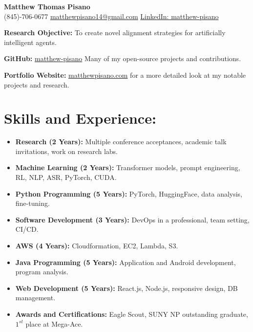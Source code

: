 \documentclass[12pt]{article}
\title{}
\author{\textbf{\LARGE Matthew Thomas Pisano}}
\date{}
\begin{document}
\pagestyle{plain}

\begin{tcolorbox}[width=\linewidth, sharp corners=all, colback=white!90!green, colframe=black]
    
    \begin{center}
        \textbf{\LARGE Matthew Thomas Pisano}\\
        \vspace{0.1in}
        (845)-706-0677 \hspace*{0.3in}
        \href{mailto:matthewpisano14@gmail.com}{matthewpisano14@gmail.com} \hspace*{0.5in}
        \href{https://www.linkedin.com/in/matthew-pisano/}{LinkedIn: matthew-pisano}
    \end{center}
    
\end{tcolorbox}

\vspace{0.1in}

\hspace*{-0.3in}
\textbf{Research Objective:} To create novel alignment strategies for artificially intelligent agents.

\vspace{0.1in}

\hspace*{-0.3in}
\textbf{GitHub:} \href{https://github.com/matthew-pisano}{matthew-pisano} Many of my open-source projects and contributions.

\hspace*{-0.3in}
\textbf{Portfolio Website:} \href{https://matthewpisano.com}{matthewpisano.com} for a more detailed look at my notable projects and research.

\section*{Skills and Experience:}
\begin{itemize}
    \itemsep0em
    \item \textbf{Research (2 Years):} Multiple conference acceptances, academic talk invitations, work on research labs.
    \item \textbf{Machine Learning (2 Years):} Transformer models, prompt engineering, RL, NLP, ASR, PyTorch, CUDA.
    \item \textbf{Python Programming (5 Years):} PyTorch, HuggingFace, data analysis, fine-tuning.
    \item \textbf{Software Development (3 Years):} DevOps in a professional, team setting, CI/CD. 
    \item \textbf{AWS (4 Years):} Cloudformation, EC2, Lambda, S3.
    \item \textbf{Java Programming (5 Years):} Application and Android development, program analysis.
    \item \textbf{Web Development (5 Years):} React.js, Node.js, responsive design, DB management.
    \item \textbf{Awards and Certifications:} Eagle Scout, SUNY NP outstanding graduate, $1^{st}$ place at Mega-Ace.
\end{itemize}
\end{document}
